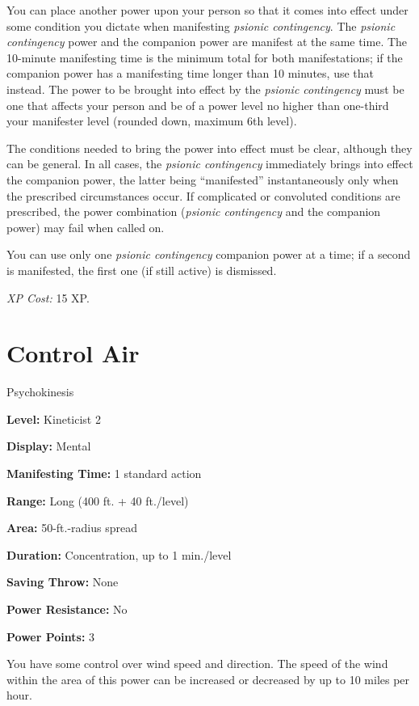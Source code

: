 \documentclass{article}
\begin{document}
You can place another power upon your person so that it comes into effect under 
some condition you dictate when manifesting \textit{psionic contingency}. The \textit{psionic 
contingency }power and the companion power are manifest at the same time. The 10-minute 
manifesting time is the minimum total for both manifestations; if the companion 
power has a manifesting time longer than 10 minutes, use that instead. The power 
to be brought into effect by the \textit{psionic contingency }must be one that 
affects your person and be of a power level no higher than one-third your manifester 
level (rounded down, maximum 6th level).

The conditions needed to bring the power into effect must be clear, although they 
can be general. In all cases, the \textit{psionic contingency }immediately brings 
into effect the companion power, the latter being ``manifested'' instantaneously 
only when the prescribed circumstances occur. If complicated or convoluted conditions 
are prescribed, the power combination (\textit{psionic contingency }and the companion 
power) may fail when called on.

You can use only one \textit{psionic contingency }companion power at a time; if 
a second is manifested, the first one (if still active) is dismissed.

\textit{XP Cost: }15 XP.

\vspace{12pt}
\section*{Control Air}

Psychokinesis

\textbf{Level:} Kineticist 2

\textbf{Display:} Mental

\textbf{Manifesting Time:} 1 standard action

\textbf{Range:} Long (400 ft. + 40 ft./level)

\textbf{Area:} 50-ft.-radius spread

\textbf{Duration:} Concentration, up to 1 min./level

\textbf{Saving Throw:} None

\textbf{Power Resistance:} No

\textbf{Power Points:} 3

You have some control over wind speed and direction. The speed of the wind within 
the area of this power can be increased or decreased by up to 10 miles per hour.
\end{document}
